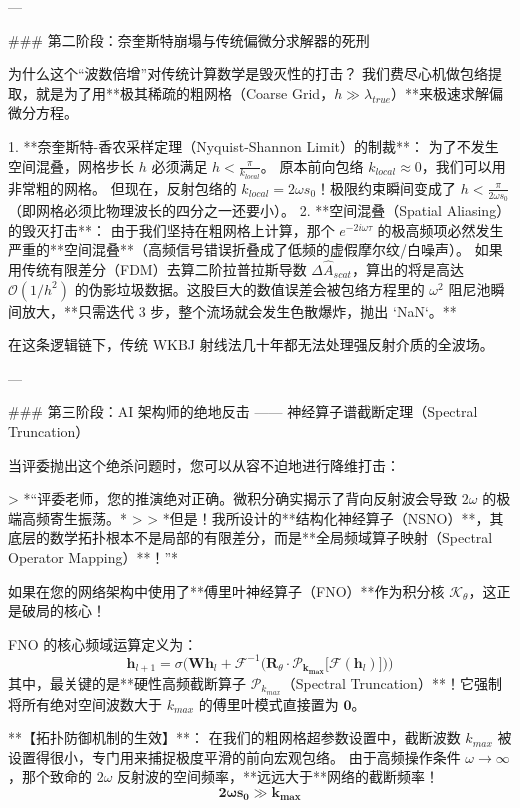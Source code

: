 \documentclass[12pt]{article}
\begin{document}
{---

### 第二阶段：奈奎斯特崩塌与传统偏微分求解器的死刑

为什么这个“波数倍增”对传统计算数学是毁灭性的打击？
我们费尽心机做包络提取，就是为了用**极其稀疏的粗网格（Coarse Grid，$h \gg \lambda_{true}$）**来极速求解偏微分方程。

1.  **奈奎斯特-香农采样定理（Nyquist-Shannon Limit）的制裁**：
    为了不发生空间混叠，网格步长 $h$ 必须满足 $h < \frac{\pi}{k_{local}}$。
    原本前向包络 $k_{local} \approx 0$，我们可以用非常粗的网格。
    但现在，反射包络的 $k_{local} = 2\omega s_0$！极限约束瞬间变成了 $h < \frac{\pi}{2\omega s_0}$（即网格必须比物理波长的四分之一还要小）。
2.  **空间混叠（Spatial Aliasing）的毁灭打击**：
    由于我们坚持在粗网格上计算，那个 $e^{-2i \omega \tau}$ 的极高频项必然发生严重的**空间混叠**（高频信号错误折叠成了低频的虚假摩尔纹/白噪声）。
    如果用传统有限差分（FDM）去算二阶拉普拉斯导数 $\Delta \hat{A}_{scat}$，算出的将是高达 $\mathcal{O}(1/h^2)$ 的伪影垃圾数据。这股巨大的数值误差会被包络方程里的 $\omega^2$ 阻尼池瞬间放大，**只需迭代 3 步，整个流场就会发生色散爆炸，抛出 `NaN`。**

在这条逻辑链下，传统 WKBJ 射线法几十年都无法处理强反射介质的全波场。

---

### 第三阶段：AI 架构师的绝地反击 —— 神经算子谱截断定理（Spectral Truncation）

当评委抛出这个绝杀问题时，您可以从容不迫地进行降维打击：

> *“评委老师，您的推演绝对正确。微积分确实揭示了背向反射波会导致 $2\omega$ 的极端高频寄生振荡。*
> 
> *但是！我所设计的**结构化神经算子（NSNO）**，其底层的数学拓扑根本不是局部的有限差分，而是**全局频域算子映射（Spectral Operator Mapping）**！”*

如果在您的网络架构中使用了**傅里叶神经算子（FNO）**作为积分核 $\mathcal{K}_\theta$，这正是破局的核心！

FNO 的核心频域运算定义为：
$$ \mathbf{h}_{l+1} = \sigma \Big( \mathbf{W} \mathbf{h}_l + \mathcal{F}^{-1} \big( \mathbf{R}_\theta \cdot \mathbf{\mathcal{P}_{k_{max}}} \big[ \mathcal{F}(\mathbf{h}_l) \big] \big) \Big) $$
其中，最关键的是**硬性高频截断算子 $\mathcal{P}_{k_{max}}$（Spectral Truncation）**！它强制将所有绝对空间波数大于 $k_{max}$ 的傅里叶模式直接置为 $\mathbf{0}$。

**【拓扑防御机制的生效】**：
在我们的粗网格超参数设置中，截断波数 $k_{max}$ 被设置得很小，专门用来捕捉极度平滑的前向宏观包络。
由于高频操作条件 $\omega \to \infty$，那个致命的 $2\omega$ 反射波的空间频率，**远远大于**网络的截断频率！
$$ \mathbf{2\omega s_0 \gg k_{max}} $$

}
\end{document}
